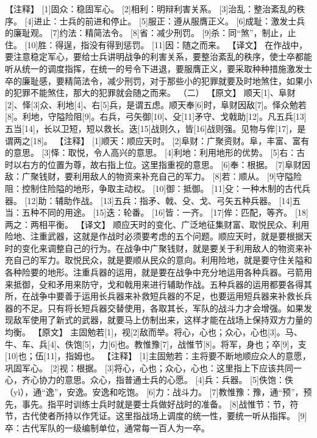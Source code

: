 \documentclass[a4paper,12pt,UTF8,twoside]{ctexbook}
\begin{document}
【注释】
[1]固众：稳固军心。
[2]相利：明辩利害关系。
[3]治乱：整治紊乱的秩序。
[4]进止：士兵的前进和停止。
[5]服正：遵从服膺正义。
[6]成耻：激发士兵的廉耻观。
[7]约法：精简法令。
[8]省：减少刑罚。
[9]杀：同“煞”，制止，止住。
[10]胜：得逞，指没有得到惩罚。
[11]因：随之而来。
【译文】
在作战中，要注意稳定军心，要给士兵讲明战争的利害关系，要整治紊乱的秩序，使士卒都能听从统一的调度指挥，在统一的号令下进退，要服膺正义，要采取种种措施激发士卒的廉耻感，要精简法令，减少刑罚，对于那些小的犯罪就要及时地煞住，如果小的犯罪不能煞住，那大的犯罪就会随之而来。
（二）
【原文】
顺天[1]、阜财[2]、怿[3]众、利地[4]、右[5]兵，是谓五虑。顺天奉[6]时，阜财因敌[7]。怿众勉若[8]。利地，守隘险阻[9]。右兵，弓矢御[10]、殳[11]矛守、戈戟助[12]。凡五兵[13]五当[14]，长以卫短，短以救长。迭[15]战则久，皆[16]战则强。见物与侔[17]，是谓两之[18]。
【注释】
[1]顺天：顺应天时。
[2]阜财：广聚资财。阜，丰富、富有的意思。
[3]怿：取悦，令人高兴的意思。
[4]利地：利用地形的优势。
[5]右：古时以右方的位置为尊，故右指上位。这里指重视的意思。
[6]奉：根据。
[7]阜财因敌：广聚钱财，要利用敌人的物资来补充自己的军力。
[8]若：顺从。
[9]守隘险阻：控制住险隘的地形，争取主动权。
[10]御：抵御。
[11]殳：一种木制的古代兵器。
[12]助：辅助作战。
[13]五兵：指矛、戟、殳、戈、弓矢五种兵器。
[14]五当：五种不同的用途。
[15]迭：轮番。
[16]皆：一齐。
[17]侔：匹配，等齐。
[18]两之：两相平衡。
【译文】
顺应天时的变化、广泛地征集财富、取悦民众、利用险地、注重武器，这就是作战时必须要考虑的五个问题。顺应天时，就是要根据天时的变化来调整自己的行为。在战争中广聚钱财，就是要关于利用敌人的物资来补充自己的军力。取悦民众，就是要顺从民众的意向。利用险地，就是要守住关隘和各种险要的地形。注重兵器的运用，就是要在战争中充分地运用各种兵器。弓箭用来抵御，殳和矛用来防守，戈和戟用来进行辅助作战。五种兵器的运用都要各得其所，在战争中要善于运用长兵器来补救短兵器的不足，也要运用短兵器来补救长兵器的不足。只有将长短兵器交替使用，各取其长，军队的战斗力才会增强。如果发现敌军使用了新式的武器，就要马上仿制出来，这样才能在战场上保持双方力量的均衡。
【原文】
主固勉若[1]，视[2]敌而举。将心，心也；众心，心也[3]。马、牛、车、兵[4]、佚饱[5]，力[6]也。教惟豫[7]，战惟节[8]。将军，身也；卒[9]，支[10]也；伍[11]，指姆也。
【注释】
[1]主固勉若：主将要不断地顺应众人的意愿，巩固军心。
[2]视：根据。
[3]将心，心也；众心，心也：这里指上下应该共同一心，齐心协力的意思。众心，指普通士兵的心愿。
[4]兵：兵器。
[5]佚饱：佚（yì），通“逸”，安逸。安逸和吃饱。
[6]力：战斗力。
[7]教惟豫：豫，通“预”，预先，事先。指平时训练士兵时就是要士兵做好战时的准备。
[8]战惟节：节，符节，古代使者所持以作凭证。这里指战场上调度的统一性，要统一听从指挥。
[9]卒：古代军队的一级编制单位，通常每一百人为一卒。
\end{document}
